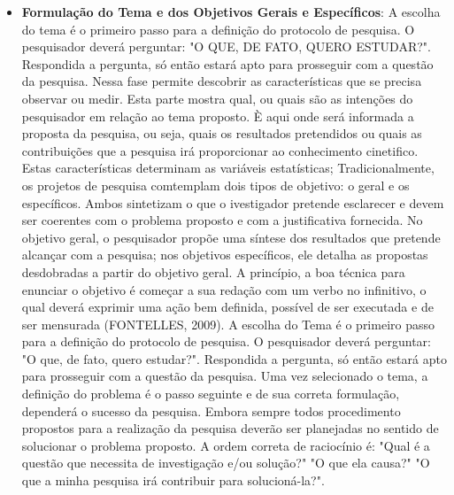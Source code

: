  \begin{itemize}
\item \textbf{Formulação do Tema e dos Objetivos Gerais e Específicos}: 
A escolha do tema é o primeiro passo para a definição do protocolo de pesquisa. O pesquisador deverá perguntar: "O QUE, DE FATO, QUERO ESTUDAR?". Respondida a pergunta, só então estará apto para pros\-se\-guir com a questão da pesquisa. Nessa fase permite
descobrir as características que se precisa observar ou medir.
Esta parte mostra qual, ou quais são as intenções do pesquisador
em relação ao tema proposto. È aqui onde será informada a proposta
da pesquisa, ou seja, quais os resultados pretendidos ou quais as
contribuições que a pesquisa irá proporcionar ao conhecimento
cinetifico. Estas características determinam as variáveis
estatísticas; Tradicionalmente, os projetos de pesquisa comtemplam
dois tipos de objetivo: o geral e os específicos. Ambos sintetizam
o que o ivestigador pretende esclarecer e devem ser coerentes com
o problema proposto e com a justificativa fornecida. No objetivo
geral, o pesquisador propõe uma síntese dos resultados que
pretende alcançar com a pesquisa; nos objetivos específicos, ele
detalha as propostas desdobradas a partir do objetivo geral. A
princípio, a boa técnica para enunciar o objetivo é começar a sua
redação com um verbo no infinitivo, o qual deverá exprimir uma
ação bem definida, possível de ser executada e de ser mensurada
(FONTELLES, 2009). A escolha do Tema é o primeiro passo para a definição do protocolo de pesquisa. O pesquisador deverá perguntar: "O que, de fato, quero estudar?". Respondida a pergunta, só então estará apto para prosseguir com a questão da pesquisa. Uma vez selecionado o tema, a definição do problema é o passo seguinte e de sua correta formulação, dependerá o sucesso da pesquisa. Embora sempre todos procedimento propostos para a realização da pesquisa deverão ser planejadas no sentido de solucionar o problema proposto. A ordem correta de raciocínio é: "Qual é a questão que necessita de investigação e/ou solução?" 
"O que ela causa?" "O que a minha pesquisa irá contribuir para solucioná-la?".     



\end{itemize}
